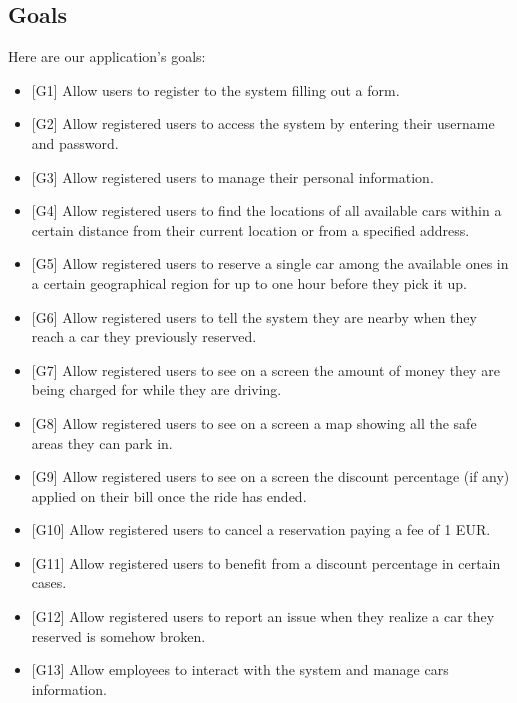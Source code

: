 \subsection{Goals}
\label{Goals}
Here are our application's goals:
\begin{itemize}
	\item {[G1]} Allow users to register to the system filling out a form. 
	\item {[G2]} Allow registered users to access the system by entering their username and password.
	\item {[G3]} Allow registered users to manage their personal information.
	\item {[G4]} Allow registered users to find the locations of all available cars within a certain distance from their current location or from a specified address.
	\item {[G5]} Allow registered users to reserve a single car among the available ones in a certain geographical region for up to one hour before they pick it up.
	\item {[G6]} Allow registered users to tell the system they are nearby when they reach a car they previously reserved.
	\item {[G7]} Allow registered users to see on a screen the amount of money they are being charged for while they are driving. 
	\item {[G8]} Allow registered users to see on a screen a map showing all the safe areas they can park in. 
	\item {[G9]} Allow registered users to see on a screen the discount percentage (if any) applied on their bill once the ride has ended.
	\item {[G10]} Allow registered users to cancel a reservation paying a fee of 1 EUR.
	\item {[G11]} Allow registered users to benefit from a discount percentage in certain cases.
	\item {[G12]} Allow registered users to report an issue when they realize a car they reserved is somehow broken.
	\item {[G13]} Allow employees to interact with the system and manage cars information.
\end{itemize}
\newpage
